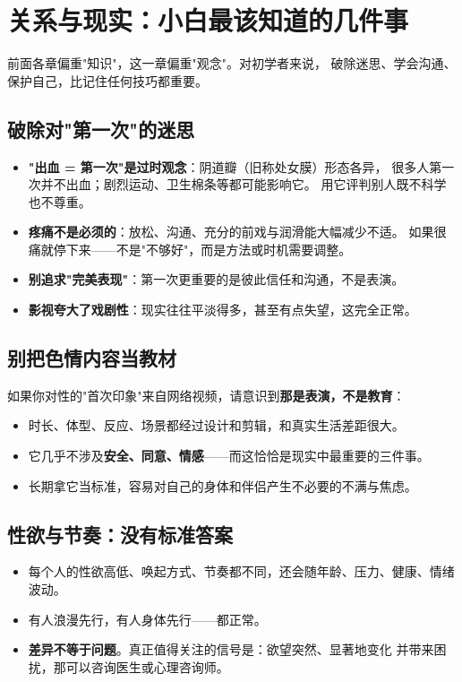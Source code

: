 \documentclass[12pt,UTF8,openany]{ctexbook}
\begin{document}
\chapter{关系与现实：小白最该知道的几件事}
\label{chap:reality}

前面各章偏重"知识"，这一章偏重"观念"。对初学者来说，
破除迷思、学会沟通、保护自己，比记住任何技巧都重要。

\section{破除对"第一次"的迷思}

\begin{itemize}[leftmargin=2em]
  \item \textbf{"出血 = 第一次"是过时观念}：阴道瓣（旧称处女膜）形态各异，
        很多人第一次并不出血；剧烈运动、卫生棉条等都可能影响它。
        用它评判别人既不科学也不尊重。
  \item \textbf{疼痛不是必须的}：放松、沟通、充分的前戏与润滑能大幅减少不适。
        如果很痛就停下来——不是"不够好"，而是方法或时机需要调整。
  \item \textbf{别追求"完美表现"}：第一次更重要的是彼此信任和沟通，不是表演。
  \item \textbf{影视夸大了戏剧性}：现实往往平淡得多，甚至有点失望，这完全正常。
\end{itemize}

\section{别把色情内容当教材}

如果你对性的"首次印象"来自网络视频，请意识到\textbf{那是表演，不是教育}：

\begin{itemize}[leftmargin=2em]
  \item 时长、体型、反应、场景都经过设计和剪辑，和真实生活差距很大。
  \item 它几乎不涉及\textbf{安全、同意、情感}——而这恰恰是现实中最重要的三件事。
  \item 长期拿它当标准，容易对自己的身体和伴侣产生不必要的不满与焦虑。
\end{itemize}

\section{性欲与节奏：没有标准答案}

\begin{itemize}[leftmargin=2em]
  \item 每个人的性欲高低、唤起方式、节奏都不同，还会随年龄、压力、健康、情绪波动。
  \item 有人浪漫先行，有人身体先行——都正常。
  \item \textbf{差异不等于问题}。真正值得关注的信号是：欲望突然、显著地变化
        并带来困扰，那可以咨询医生或心理咨询师。
\end{itemize}
\end{document}
